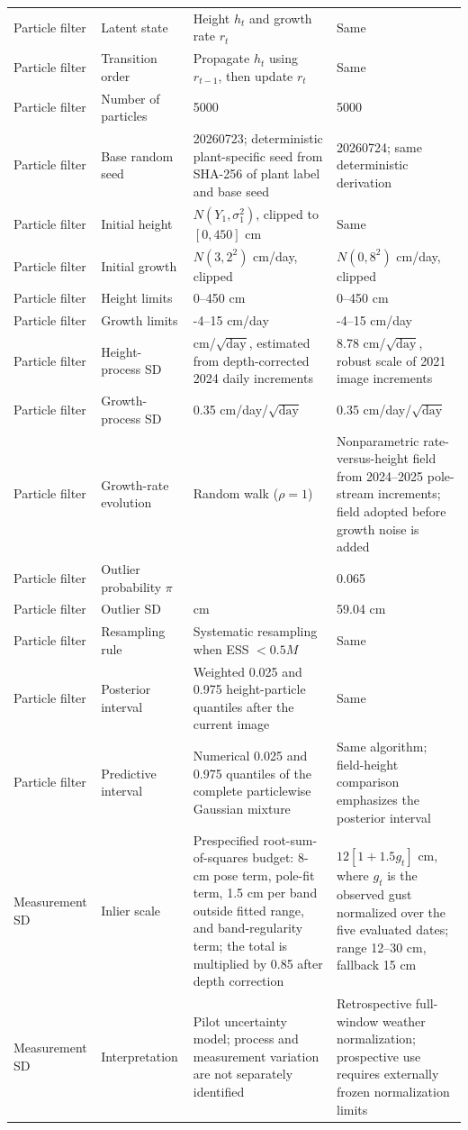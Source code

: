 \documentclass[review,12pt,authoryear]{elsarticle}
\begin{document}
\begin{longtable}{L{2.45cm}L{4.05cm}L{3.25cm}L{3.25cm}}
Particle filter & Latent state & Height $h_t$ and growth rate $r_t$ & Same \\
Particle filter & Transition order & Propagate $h_t$ using $r_{t-1}$, then update $r_t$ & Same \\
Particle filter & Number of particles & 5000 & 5000 \\
Particle filter & Base random seed & 20260723; deterministic plant-specific seed from SHA-256 of plant label and base seed & 20260724; same deterministic derivation \\
Particle filter & Initial height & $N(Y_1,\sigma_1^2)$, clipped to $[0,450]$ cm & Same \\
Particle filter & Initial growth & $N(3,2^2)$ cm/day, clipped & $N(0,8^2)$ cm/day, clipped \\
Particle filter & Height limits & 0--450 cm & 0--450 cm \\
Particle filter & Growth limits & -4--15 cm/day & -4--15 cm/day \\
Particle filter & Height-process SD & \ProcessHeightSD{} cm/$\sqrt{\mathrm{day}}$, estimated from depth-corrected 2024 daily increments & 8.78 cm/$\sqrt{\mathrm{day}}$, robust scale of 2021 image increments \\
Particle filter & Growth-process SD & 0.35 cm/day/$\sqrt{\mathrm{day}}$ & 0.35 cm/day/$\sqrt{\mathrm{day}}$ \\
Particle filter & Growth-rate evolution & Random walk ($\rho=1$) & Nonparametric rate-versus-height field from 2024--2025 pole-stream increments; field adopted before growth noise is added \\
Particle filter & Outlier probability $\pi$ & \OutlierProbability{} & 0.065 \\
Particle filter & Outlier SD & \OutlierSD{} cm & 59.04 cm \\
Particle filter & Resampling rule & Systematic resampling when ESS $<0.5M$ & Same \\
Particle filter & Posterior interval & Weighted 0.025 and 0.975 height-particle quantiles after the current image & Same \\
Particle filter & Predictive interval & Numerical 0.025 and 0.975 quantiles of the complete particlewise Gaussian mixture & Same algorithm; field-height comparison emphasizes the posterior interval \\

Measurement SD & Inlier scale & Prespecified root-sum-of-squares budget: 8-cm pose term, pole-fit term, 1.5 cm per band outside fitted range, and band-regularity term; the total is multiplied by 0.85 after depth correction & $12[1+1.5g_t]$ cm, where $g_t$ is the observed gust normalized over the five evaluated dates; range 12--30 cm, fallback 15 cm \\
Measurement SD & Interpretation & Pilot uncertainty model; process and measurement variation are not separately identified & Retrospective full-window weather normalization; prospective use requires externally frozen normalization limits \\


\end{longtable}
\end{document}
